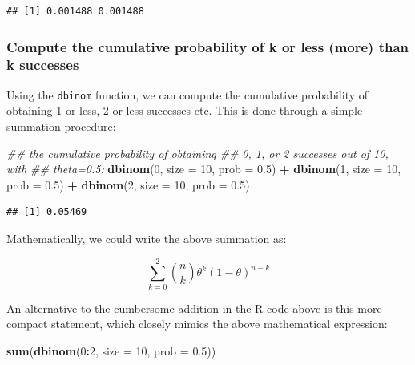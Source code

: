\documentclass[12pt,]{krantz}
\newenvironment{Shaded}{\begin{snugshade}}{\end{snugshade}}
\newcommand{\CommentTok}[1]{\textcolor[rgb]{0.56,0.35,0.01}{\textit{#1}}}
\newcommand{\DataTypeTok}[1]{\textcolor[rgb]{0.13,0.29,0.53}{#1}}
\newcommand{\DecValTok}[1]{\textcolor[rgb]{0.00,0.00,0.81}{#1}}
\newcommand{\FloatTok}[1]{\textcolor[rgb]{0.00,0.00,0.81}{#1}}
\newcommand{\KeywordTok}[1]{\textcolor[rgb]{0.13,0.29,0.53}{\textbf{#1}}}
\newcommand{\NormalTok}[1]{#1}
\newcommand{\OperatorTok}[1]{\textcolor[rgb]{0.81,0.36,0.00}{\textbf{#1}}}
\newcommand{\StringTok}[1]{\textcolor[rgb]{0.31,0.60,0.02}{#1}}
\begin{document}
\begin{verbatim}
## [1] 0.001488 0.001488
\end{verbatim}

\hypertarget{compute-the-cumulative-probability-of-k-or-less-more-than-k-successes}{%
\subsubsection{Compute the cumulative probability of k or less (more) than k successes}\label{compute-the-cumulative-probability-of-k-or-less-more-than-k-successes}}

Using the \texttt{dbinom} function, we can compute the cumulative probability of obtaining 1 or less, 2 or less successes etc. This is done through a simple summation procedure:

\begin{Shaded}
\begin{Highlighting}[]
\CommentTok{## the cumulative probability of obtaining}
\CommentTok{## 0, 1, or 2 successes out of 10, with}
\CommentTok{## theta=0.5:}
\KeywordTok{dbinom}\NormalTok{(}\DecValTok{0}\NormalTok{, }\DataTypeTok{size =} \DecValTok{10}\NormalTok{, }\DataTypeTok{prob =} \FloatTok{0.5}\NormalTok{) }\OperatorTok{+}\StringTok{ }\KeywordTok{dbinom}\NormalTok{(}\DecValTok{1}\NormalTok{, }
  \DataTypeTok{size =} \DecValTok{10}\NormalTok{, }\DataTypeTok{prob =} \FloatTok{0.5}\NormalTok{) }\OperatorTok{+}\StringTok{ }\KeywordTok{dbinom}\NormalTok{(}\DecValTok{2}\NormalTok{, }\DataTypeTok{size =} \DecValTok{10}\NormalTok{, }
  \DataTypeTok{prob =} \FloatTok{0.5}\NormalTok{)}
\end{Highlighting}
\end{Shaded}

\begin{verbatim}
## [1] 0.05469
\end{verbatim}

Mathematically, we could write the above summation as:

\begin{equation}
\sum_{k=0}^2 \binom{n}{k} \theta^{k} (1-\theta)^{n-k} 
\end{equation}

An alternative to the cumbersome addition in the R code above is this more compact statement, which closely mimics the above mathematical expression:

\begin{Shaded}
\begin{Highlighting}[]
\KeywordTok{sum}\NormalTok{(}\KeywordTok{dbinom}\NormalTok{(}\DecValTok{0}\OperatorTok{:}\DecValTok{2}\NormalTok{, }\DataTypeTok{size =} \DecValTok{10}\NormalTok{, }\DataTypeTok{prob =} \FloatTok{0.5}\NormalTok{))}
\end{Highlighting}
\end{Shaded}
\end{document}
